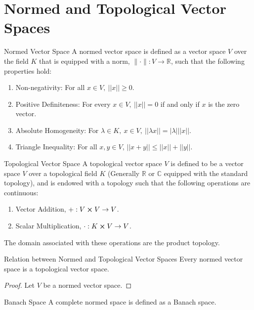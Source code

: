 \chapter{Normed and Topological Vector Spaces}
\begin{Definition}{Normed Vector Space}\label{normed_vector_space}
  A normed vector space is defined as a vector space $V$ over the field $K$ that is equipped with a norm, $\| \cdot \|:V\to\mathbb{R}$, such that the following properties hold:
  \begin{enumerate}
    \item Non-negativity: For all $x\in V,\ ||x||\geq 0$.
    \item Positive Definiteness: For every $x\in V,\ ||x||=0$ if and only if $x$ is the zero vector.
    \item Absolute Homogeneity: For $\lambda\in K,\ x\in V,\ ||\lambda x||=|\lambda| ||x||$.
    \item Triangle Inequality: For all $x,y\in V$, $||x+y||\leq||x||+||y||$.
  \end{enumerate}
\end{Definition}
\begin{Definition}{Topological Vector Space}\label{topological_vector_space}
  A topological vector space $V$ is defined to be a vector space $V$ over a topological field $K$ (Generally $\mathbb{R}$ or $\mathbb{C}$ equipped with the standard topology), and is endowed with a topology such that the following operations are continuous:
  \begin{enumerate}
    \item Vector Addition, $+: V\cross V\to V$.
    \item Scalar Multiplication, $\cdot: K\cross V\to V$.
  \end{enumerate}
  The domain associated with these operations are the product topology.
\end{Definition}
\begin{Theorem}{Relation between Normed and Topological Vector Spaces}\label{relation_between_normed_and_topological_vector_spaces}
  Every normed vector space is a topological vector space.
\end{Theorem}
\begin{proof}
  Let $V$ be a normed vector space.
\end{proof}
\begin{Definition}{Banach Space}\label{banach_space}
  A complete normed space is defined as a Banach space.
\end{Definition}
